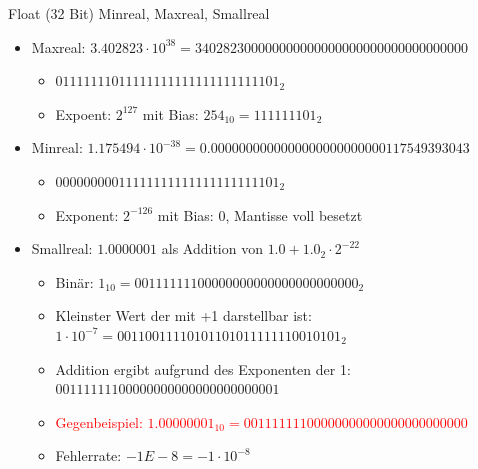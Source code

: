 \documentclass[12pt%
,xcolor=table
,aspectratio=169%
]{beamer}
\begin{document}
\begin{frame}{Float (32 Bit) Minreal, Maxreal, Smallreal}
\begin{itemize}
	\item Maxreal: $3.402823 \cdot 10^{38} = 340282300000000000000000000000000000000$
	\begin{itemize}
		\item $01111111011111111111111111111101_2$
		\item Expoent: $2^127$ mit Bias: $254_{10} = 111111101_2$
	\end{itemize}
	\item Minreal: $1.175494 \cdot 10^{-38} = 0.0000000000000000000000000117549393043$
	\begin{itemize}
		\item $00000000011111111111111111111101_2$
		\item Exponent: $2^{-126}$ mit Bias: 0, Mantisse voll besetzt
	\end{itemize}
	\item Smallreal: $1.0000001$ als Addition von $1.0 + 1.0_2 \cdot 2^{-22}$
	\begin{itemize}
		\item Binär: $1_{10} = 00111111100000000000000000000000_2$
		\item Kleinster Wert der mit +1 darstellbar ist: $1 \cdot 10^{-7} = 00110011110101101011111110010101_2$
		\item Addition ergibt aufgrund des Exponenten der 1: $00111111100000000000000000000001$
		\item \textcolor{red}{Gegenbeispiel: $1.00000001_{10} = 00111111100000000000000000000000$}
		\item Fehlerrate: $-1E-8 = -1 \cdot 10^{-8}$
	\end{itemize}
\end{itemize}
\end{frame}
\end{document}
